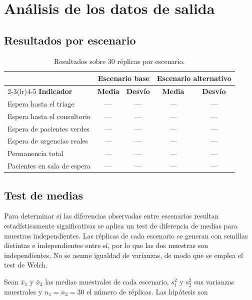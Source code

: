 \section{Análisis de los datos de salida}

\subsection{Resultados por escenario}

\begin{table}[H]
\centering
\small
\begin{tabular}{lcccc}
\toprule
 & \multicolumn{2}{c}{\textbf{Escenario base}} & \multicolumn{2}{c}{\textbf{Escenario alternativo}} \\
\cmidrule(lr){2-3}\cmidrule(lr){4-5}
\textbf{Indicador} & \textbf{Media} & \textbf{Desvío} & \textbf{Media} & \textbf{Desvío} \\
\midrule
Espera hasta el triage      & --- & --- & --- & --- \\
Espera hasta el consultorio & --- & --- & --- & --- \\
Espera de pacientes verdes  & --- & --- & --- & --- \\
Espera de urgencias reales  & --- & --- & --- & --- \\
Permanencia total           & --- & --- & --- & --- \\
Pacientes en sala de espera & --- & --- & --- & --- \\
\bottomrule
\end{tabular}
\caption{Resultados sobre 30 réplicas por escenario.}
\label{tab:resultados}
\end{table}

\subsection{Test de medias}

Para determinar si las diferencias observadas entre escenarios resultan
estadísticamente significativas se aplica un test de diferencia de medias
para muestras independientes. Las réplicas de cada escenario se generan con
semillas distintas e independientes entre sí, por lo que las dos muestras son
independientes. No se asume igualdad de varianzas, de modo que se emplea el
test de Welch.

Sean $\bar{x}_1$ y $\bar{x}_2$ las medias muestrales de cada escenario,
$s_1^2$ y $s_2^2$ sus varianzas muestrales y $n_1 = n_2 = 30$ el número de
réplicas. Las hipótesis son

